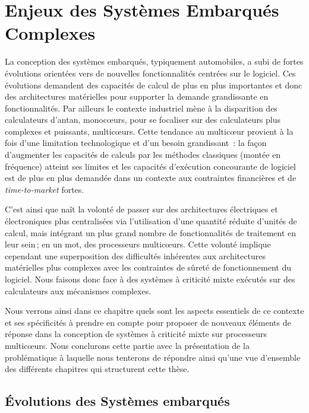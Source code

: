 \documentclass[french, a4paper, 11pt, twoside, pdftex]{StyleThese}
\begin{document}
\setcounter{chapter}{1}
\dominitoc
\faketableofcontents
\fi

\chapter{Enjeux des Systèmes Embarqués Complexes} \label{chap:1_EnjeuxIntro}
\minitoc

La conception des systèmes embarqués, typiquement automobiles, a subi de fortes évolutions orientées vers de nouvelles fonctionnalités centrées sur le logiciel.
Ces évolutions demandent des capacités de calcul de plus en plus importantes et donc des architectures matérielles pour supporter la demande grandissante en fonctionnalités.
Par ailleurs le contexte industriel mène à la disparition des calculateurs d'antan, monocœurs, pour se focaliser sur des calculateurs plus complexes et puissants, multicœurs.
Cette tendance au multicœur provient à la fois d'une limitation technologique et d'un besoin grandissant~: la façon d'augmenter les capacités de calculs par les méthodes classiques (montée en fréquence) atteint ses limites et les capacités d'exécution concourante de logiciel est de plus en plus demandée dans un contexte aux contraintes financières et de \textit{time-to-market} fortes.

C'est ainsi que naît la volonté de passer sur des architectures électriques et électroniques plus centralisées via l'utilisation d'une quantité réduite d'unités de calcul, mais intégrant un plus grand nombre de fonctionnalités de traitement en leur sein ; en un mot, des processeurs multicœurs. Cette volonté implique cependant une superposition des difficultés inhérentes aux architectures matérielles plus complexes avec les contraintes de sûreté de fonctionnement du logiciel. Nous faisons donc face à des systèmes à criticité mixte exécutés sur des calculateurs aux mécanismes complexes.

Nous verrons ainsi dans ce chapitre quels sont les aspects essentiels de ce contexte et ses spécificités à prendre en compte pour proposer de nouveaux éléments de réponse dans la conception de systèmes à criticité mixte sur processeurs multicœurs. Nous conclurons cette partie avec la présentation de la problématique à laquelle nous tenterons de répondre ainsi qu'une vue d'ensemble des différents chapitres qui structurent cette thèse.

\section{Évolutions des Systèmes embarqués}
\end{document}
